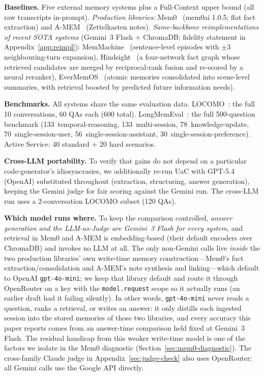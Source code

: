 \textbf{Baselines.} Five external memory systems plus a Full-Context upper bound (all raw transcripts in-prompt). \emph{Production libraries:} Mem0~\citep{chhikara2025mem0} (mem0ai 1.0.5; flat fact extraction) and A-MEM~\citep{xu2025amem} (Zettelkasten notes). \emph{Same-backbone reimplementations of recent SOTA systems} (Gemini~3 Flash + ChromaDB; fidelity statement in Appendix~\ref{app:reimpl}): MemMachine~\citep{wang2026memmachine} (sentence-level episodes with $\pm 3$ neighbouring-turn expansion), Hindsight~\citep{latimer2025hindsight} (a four-network fact graph whose retrieved candidates are merged by reciprocal-rank fusion and re-scored by a neural reranker), EverMemOS~\citep{hu2026evermemos} (atomic memories consolidated into scene-level summaries, with retrieval boosted by predicted future information needs).

\textbf{Benchmarks.} All systems share the same evaluation data. LOCOMO~\citep{maharana2024locomo}: the full 10 conversations, 60 QAs each (600 total). LongMemEval~\citep{wu2025longmemeval}: the full 500-question benchmark (133~temporal-reasoning, 133~multi-session, 78~knowledge-update, 70~single-session-user, 56~single-session-assistant, 30~single-session-preference). Active Service: 40 standard + 20 hard scenarios.

\textbf{Cross-LLM portability.} To verify that gains do not depend on a particular code-generator's idiosyncrasies, we additionally re-run UaC with GPT-5.4 (OpenAI) substituted throughout (extraction, structuring, answer generation), keeping the Gemini judge for fair scoring against the Gemini run. The cross-LLM run uses a 2-conversation LOCOMO subset (120 QAs).

\textbf{Which model runs where.}\label{sec:openrouter} To keep the comparison controlled, \emph{answer generation and the LLM-as-Judge are Gemini~3 Flash for every system}, and retrieval in Mem0 and A-MEM is embedding-based (their default encoders over ChromaDB) and invokes no LLM at all. The only non-Gemini calls live \emph{inside} the two production libraries' own write-time memory construction---Mem0's fact extraction/consolidation and A-MEM's note synthesis and linking---which default to OpenAI \texttt{gpt-4o-mini}; we keep that library default and route it through OpenRouter on a key with the \texttt{model.request} scope so it actually runs (an earlier draft had it failing silently). In other words, \texttt{gpt-4o-mini} never reads a question, ranks a retrieval, or writes an answer: it only distills each ingested session into the stored memories of those two libraries, and every accuracy this paper reports comes from an answer-time comparison held fixed at Gemini~3 Flash. The residual handicap from this weaker write-time model is one of the factors we isolate in the Mem0 diagnostic (Section~\ref{sec:mem0-diagnostic}). The cross-family Claude judge in Appendix~\ref{sec:judge-check} also uses OpenRouter; all Gemini calls use the Google API directly.

